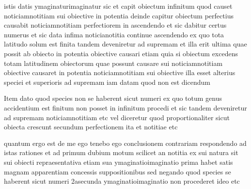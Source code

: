 \documentclass[twoside, openright]{report}
\begin{document}
        \pstart
        istis datis ymaginaturimaginatur sic et capit obiectum infinitum quod causet noticiamnotitiam sui obiective in potentia deinde capitur obiectum perfectius causabit noticiamnotitiam perfectiorem in ascendendo et sic dabitur certus numerus et sic data infima noticianotitia continue ascendendo ex quo tota latitudo solum est finita tandem deveniretur ad supremam et illa erit ultima quae possit ab obiecto in potentia obiective causari etiam quia si obiectum excedens totam latitudinem obiectorum quae possunt causare sui noticiamnotitiam obiective causaret in potentia noticiamnotitiam sui obiective illa esset alterius speciei et superioris ad supremam iam datam quod non est dicendum
        \pend
     
        \pstart
        Item dato quod species non se haberent sicut numeri ex quo totum genus accidentium est finitum non posset in infinitum procedi et sic tandem deveniretur ad supremam noticiamnotitiam etc vel diceretur quod proportionaliter sicut obiecta crescunt secundum perfectionem ita et notitiae etc
        \pend
     
        \pstart
        quantum ergo est de me ego tenebo ego conclusionem contrariam  respondendo ad istas rationes et ad primum dubium motum scilicet an notitia ex sui natura sit sui obiecti repraesentativa etiam sua ymaginatioimaginatio prima habet satis magnam apparentiam concessis suppositionibus sed negando quod species se haberent sicut numeri  2asecunda ymaginatioimaginatio non procederet ideo etc
        \pend
        
        \endnumbering
        
     
        
\end{document}
